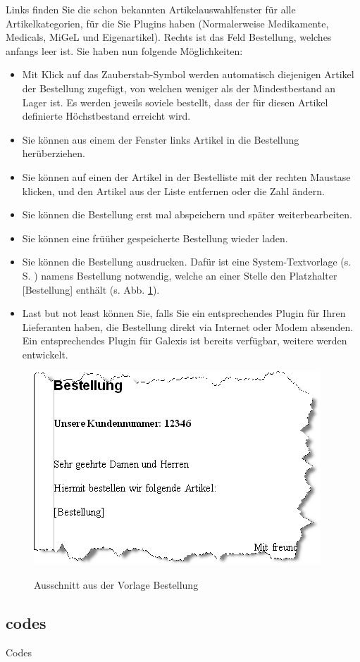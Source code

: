 Links finden Sie die schon bekannten Artikelauswahlfenster für alle
Artikelkategorien, für die Sie Plugins haben (Normalerweise Medikamente,
Medicals, MiGeL und Eigenartikel). Rechts ist das Feld Bestellung, welches
anfangs leer ist. Sie haben nun folgende Möglichkeiten:
\begin{itemize}
  \item Mit Klick auf das Zauberstab-Symbol werden automatisch diejenigen
  Artikel der Bestellung zugefügt, von welchen weniger als der Mindestbestand an
  Lager ist. Es werden jeweils soviele bestellt, dass der für diesen Artikel
  definierte Höchstbestand erreicht wird.
  \item Sie können aus einem der Fenster links Artikel in die Bestellung
  herüberziehen.
	\item Sie können auf einen der Artikel in der Bestelliste mit der rechten
	Maustase klicken, und den Artikel aus der Liste entfernen oder die Zahl ändern.
	
	\item Sie können die Bestellung erst mal abspeichern und später weiterbearbeiten.
	
	\item Sie können eine früüher gespeicherte Bestellung wieder laden.
	\item Sie können die Bestellung ausdrucken. Dafür ist eine System-Textvorlage (s. S.
	\pageref{textvorlagen}) namens \glqq Bestellung\grqq{} notwendig, welche an
	einer Stelle den Platzhalter [Bestellung] enthält (s. Abb. \ref{fig:bestell2}).
	\item Last but not least können Sie, falls Sie ein entsprechendes Plugin für
	Ihren Lieferanten haben, die Bestellung direkt via Internet oder Modem
	absenden. Ein entsprechendes Plugin für Galexis ist bereits verfügbar, weitere
	werden entwickelt.
\end{itemize}
\begin{figure}[hb]
  \includegraphics{images/bestell2}\\
  \caption{Ausschnitt aus der Vorlage Bestellung}\label{fig:bestell2}
\end{figure}

\subsection{codes}
Codes



